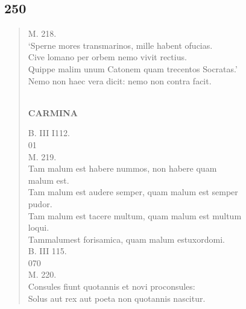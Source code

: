 \documentclass[11pt, a4paper]{report}
\begin{document}
            \subsection*{250}
      \begin{verse}
      M. 218. \\ ‘Sperne mores transmarinos, mille habent ofucias. \\ Cive lomano per orbem nemo vivit rectius. \\ Quippe malim unum Catonem quam trecentos Socratas.’ \\ Nemo non haec vera dicit: nemo non contra facit. \\ 
        ﻿\pagebreak 
    \begin{center} \textbf{CARMINA} \end{center} \marginpar{[202]} B. III I112. \\ 01 \\ M. 219. \\ Tam malum est habere nummos, non habere quam \\ malum est. \\ Tam malum est audere semper, quam malum est semper \\ pudor. \\ Tam malum est tacere multum, quam malum est multum \\ loqui. \\ Tammalumest forisamica, quam malum estuxordomi. \\ B. III 115. \\ 070 \\ M. 220. \\ Consules fiunt quotannis et novi proconsules: \\ Solus aut rex aut poeta non quotannis nascitur. \\ 
      \end{verse}
  
\end{document}
